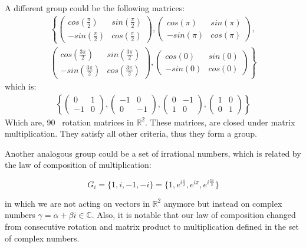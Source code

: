 \begin{example}
\label{ex:matrix_z4}
A different group could be the following matrices:
%
\begin{align}
\nonumber\left\lbrace 
\left( \begin{array}{cc}
cos(\frac{\pi}{2}) & sin(\frac{\pi}{2}) \\
 -sin(\frac{\pi}{2}) &  cos(\frac{\pi}{2}) \end{array} \right),
\left( \begin{array}{cc}
cos(\pi) & sin(\pi) \\
 -sin(\pi) &  cos(\pi) \end{array} \right),\right. \\
\left.
\left( \begin{array}{cc}
cos(\frac{3\pi}{2}) & sin(\frac{3\pi}{2}) \\
 -sin(\frac{3\pi}{2}) &  cos(\frac{3\pi}{2}) \end{array} \right),
\left( \begin{array}{cc}
cos(0) & sin(0) \\
 -sin(0) &  cos(0) \end{array} \right)  
\right\rbrace
\end{align} 
which is:
\begin{align}
\left\lbrace 
\left( \begin{array}{cc}
0 & 1 \\
 -1 & 0 \end{array} \right) ,
\left( \begin{array}{cc}
-1 & 0 \\
 0 & -1 \end{array} \right) ,
\left( \begin{array}{cc}
0 & -1 \\
 1 & 0 \end{array} \right) ,
\left( \begin{array}{cc}
1 & 0 \\
 0 & 1 \end{array} \right) 
\right\rbrace
\end{align} 
Which are, 90 \degree \ rotation matrices in $\mathbb{R}^2$. These matrices, are closed under matrix multiplication. They satisfy all other criteria, thus they form a group.
 \end{example}
 \begin{example}
 \label{ex:complex_z4}
 Another analogous group could be a set of irrational numbers, which is related by the law of composition of multiplication:
 
\[ G_{i} = \{ 1,i,-1,-i\} = \{ 1,e^{i\frac{\pi}{2}},e^{i\pi},e^{i\frac{3\pi}{2}}\}\]

in which we are not acting on vectors in $\mathbb{R}^2 $ anymore but instead on complex numbers $\gamma  = \alpha+\beta i \in \mathbb{C}$. Also, it is notable that our law of composition changed from consecutive rotation and matrix product to multiplication defined in the set of complex numbers.
\end{example} 


